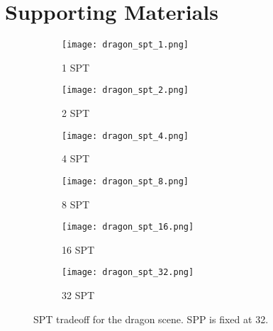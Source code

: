 \chapter{Supporting Materials}

\begin{figure}[htb]
  \begin{subfigure}{0.49\textwidth}
  \texttt{[image: dragon\_spt\_1.png]}
  \caption{1 SPT}
  \end{subfigure}
  \hspace*{\fill} %
  \begin{subfigure}{0.49\textwidth}
  \texttt{[image: dragon\_spt\_2.png]}
  \caption{2 SPT}
  \end{subfigure}
  \qquad
  \begin{subfigure}{0.49\textwidth}
  \texttt{[image: dragon\_spt\_4.png]}
  \caption{4 SPT}
  \end{subfigure}
  \hspace*{\fill} %
  \begin{subfigure}{0.49\textwidth}
  \texttt{[image: dragon\_spt\_8.png]}
  \caption{8 SPT}
  \end{subfigure}
  \qquad
  \begin{subfigure}{0.49\textwidth}
  \texttt{[image: dragon\_spt\_16.png]}
  \caption{16 SPT}
  \end{subfigure}
  \hspace*{\fill} %
  \begin{subfigure}{0.49\textwidth}
  \texttt{[image: dragon\_spt\_32.png]}
  \caption{32 SPT}
  \end{subfigure}

  \caption{\label{fig:spt_tradeoff_AO}
           SPT tradeoff for the dragon scene. SPP is fixed at 32.
           }
\end{figure}

